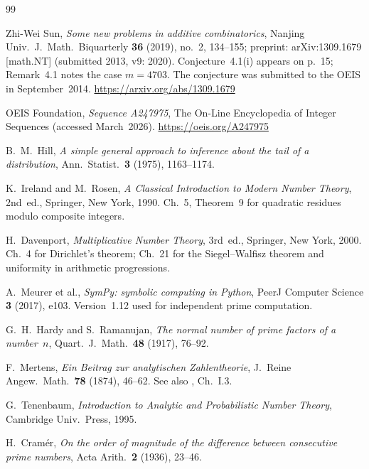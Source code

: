 \documentclass[12pt]{article}
\begin{document}
\begin{thebibliography}{99}
	
	Zhi-Wei Sun,
	\textit{Some new problems in additive combinatorics},
	Nanjing Univ.\ J.\ Math.\ Biquarterly \textbf{36} (2019), no.~2,
	134--155; preprint: arXiv:1309.1679 [math.NT] (submitted 2013,
	v9: 2020).
	Conjecture~4.1(i) appears on p.~15; Remark~4.1 notes the case
	$m = 4703$. The conjecture was submitted to the OEIS in
	September~2014.
	\url{https://arxiv.org/abs/1309.1679}
	
	OEIS Foundation,
	\textit{Sequence A247975},
	The On-Line Encyclopedia of Integer Sequences
	(accessed March~2026).
	\url{https://oeis.org/A247975}
	
	B.~M.~Hill,
	\textit{A simple general approach to inference about the tail of a
		distribution},
	Ann.\ Statist.\ \textbf{3} (1975), 1163--1174.
	
	K.~Ireland and M.~Rosen,
	\textit{A Classical Introduction to Modern Number Theory},
	2nd~ed., Springer, New York, 1990.
	Ch.~5, Theorem~9 for quadratic residues modulo composite integers.
	
	H.~Davenport,
	\textit{Multiplicative Number Theory},
	3rd~ed., Springer, New York, 2000.
	Ch.~4 for Dirichlet's theorem; Ch.~21 for the Siegel--Walfisz
	theorem and uniformity in arithmetic progressions.
	
	A.~Meurer et al.,
	\textit{SymPy: symbolic computing in Python},
	PeerJ Computer Science \textbf{3} (2017), e103.
	Version~1.12 used for independent prime computation.
	
	G.~H.~Hardy and S.~Ramanujan,
	\textit{The normal number of prime factors of a number~$n$},
	Quart.\ J.\ Math.\ \textbf{48} (1917), 76--92.
	
	F.~Mertens,
	\textit{Ein Beitrag zur analytischen Zahlentheorie},
	J.\ Reine Angew.\ Math.\ \textbf{78} (1874), 46--62.
	See also \cite{Tenenbaum1995}, Ch.~I.3.
	
	G.~Tenenbaum,
	\textit{Introduction to Analytic and Probabilistic Number Theory},
	Cambridge Univ.\ Press, 1995.
	
	H.~Cram\'er,
	\textit{On the order of magnitude of the difference between consecutive
		prime numbers},
	Acta Arith.\ \textbf{2} (1936), 23--46.
	

\end{thebibliography}
\end{document}
